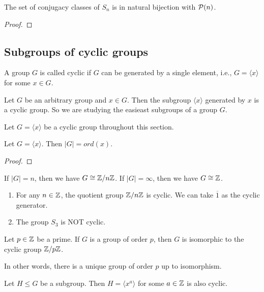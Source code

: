 \begin{thm}
    The set of conjugacy classes of $S_n$ is in natural bijection with $\mathcal {P}(n)$.
\end{thm}

\begin{proof}

\end{proof}

\subsection{Subgroups of cyclic groups}
\begin{defi}
    A group $G$ is called cyclic if $G$ can be generated by a single element, i.e., $G = \langle x\rangle$ for some $x \in G$.
\end{defi}
Let $G$ be an arbitrary group and $x \in G$. Then  the  subgroup $\langle x\rangle$ generated by $x$ is a cyclic group. So we are studying the easieast subgroups of a group $G$.

Let $G = \langle x \rangle$ be a cyclic group throughout this section.
\begin{lem}
    Let $G = \langle x \rangle $. Then $|G| =ord(x)$.
\end{lem}
\begin{proof}

\end{proof}

\begin{cor}
    If $|G| = n$, then we have $ G \cong \mathbb {Z}/n\mathbb {Z}$. If $|G| = \infty$, then we have $ G \cong \mathbb {Z}$.
\end{cor}
\begin{example}
    \begin{enumerate}
        \item For any $n \in \mathbb {Z}$, the quotient group $\mathbb {Z}/ n \mathbb {Z}$ is cyclic. We can take $\overline{1}$ as the cyclic generator.
        \item The group $S_3$ is NOT cyclic.
    \end{enumerate}
\end{example}

\begin{lem}
    Let $p \in \mathbb {Z}$ be a prime. If $G$ is a group of order $p$, then $G$ is isomorphic to the cyclic group $\mathbb {Z}/p\mathbb {Z}$.

    In other words, there is a unique group of order $p$ up to isomorphism.
\end{lem}

\begin{prop}
    Let $H \le G$ be a subgroup. Then $H = \langle x^a \rangle$ for some $a \in \mathbb {Z}$ is also cyclic.
\end{prop}

